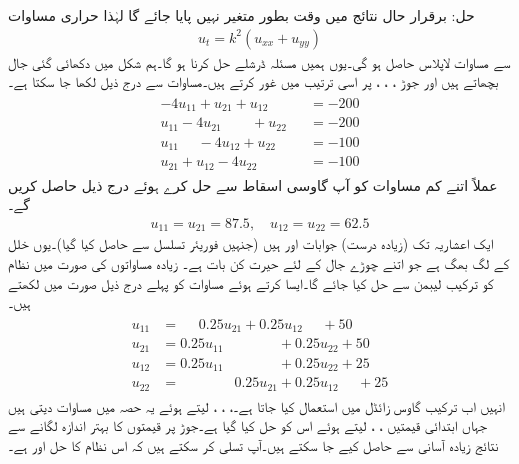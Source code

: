 حل:\quad
برقرار حال نتائج میں وقت بطور متغیر نہیں پایا جائے گا لہٰذا حراری مساوات
\begin{align*}
u_t=k^2(u_{xx}+u_{yy})
\end{align*}
سے مساوات لاپلاس حاصل ہو گی۔یوں ہمیں مسئلہ ڈرشلے حل کرنا ہو گا۔ہم شکل میں دکھائی گئی جال بچھاتے ہیں اور جوڑ ، ، ،  پر اسی ترتیب میں غور کرتے ہیں۔مساوات  سے درج ذیل لکھا جا سکتا ہے۔
\begin{gather}
\begin{aligned}\label{مساوات_اعدادی_نظام_لیبمن_الف}
-4u_{11}+u_{21}+u_{12}\phantom{+u_{13}}&=-200\\
u_{11}-4u_{21}\phantom{+u_{23}}+u_{22}&=-200\\
u_{11}\phantom{u_{22}}-4u_{12}+u_{22}&=-100\\
u_{21}+u_{12}-4u_{22}&=-100
\end{aligned}
\end{gather}
عملاً اتنے کم مساوات کو آپ گاوسی اسقاط سے حل کرے ہوئے درج ذیل حاصل کریں گے۔
\begin{align*}
u_{11}=u_{21}=87.5,\quad u_{12}=u_{22}=62.5
\end{align*}
ایک اعشاریہ  تک (زیادہ درست) جوابات  اور  ہیں (جنہیں فوریئر تسلسل سے حاصل کیا گیا)۔یوں خلل  کے لگ بھگ ہے جو اتنے چوڑے جال کے لئے حیرت کن بات ہے۔ زیادہ مساواتوں کی صورت میں نظام کو ترکیب لیبمن سے حل کیا جائے گا۔ایسا کرتے ہوئے مساوات  کو پہلے درج ذیل صورت میں لکھتے ہیں۔
\begin{gather}
\begin{aligned}\label{مساوات_اعدادی_نظام_لیبمن_ب}
u_{11}&=\phantom{u_{23}}0.25u_{21}+0.25u_{12}\phantom{u_{32}}+50\\
u_{21}&=0.25u_{11}\phantom{u_{23}+u_{32}}+0.25u_{22}+50\\
u_{12}&=0.25u_{11}\phantom{u_{23}+u_{21}}+0.25u_{22}+25\\
u_{22}&=\phantom{u_{12}+u_{23}}0.25u_{21}+0.25u_{12}\phantom{u_{21}}+25
\end{aligned}
\end{gather} 
انہیں اب ترکیب گاوس زائڈل میں استعمال کیا جاتا ہے۔، ، ،  لیتے ہوئے یہ  حصہ میں مساوات دیتی ہیں جہاں ابتدائی قیمتیں ، ،  لیتے ہوئے اس کو  حل کیا گیا ہے۔جوڑ پر قیمتوں کا بہتر اندازہ لگانے سے نتائج زیادہ آسانی سے حاصل کیے جا سکتے ہیں۔آپ تسلی کر سکتے ہیں کہ اس نظام کا حل  اور  ہے۔

